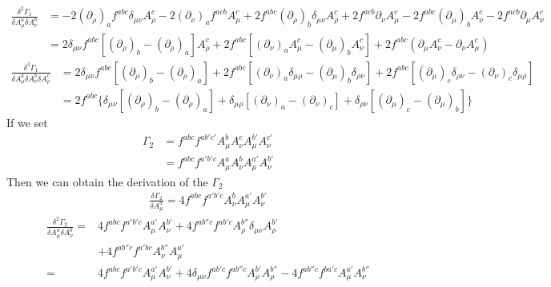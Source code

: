 \documentclass[UTF8]{article}
\begin{document}
\begin{equation}
\begin{split}
\frac{\delta^2\Gamma_1}{\delta A^{a}_{\mu}\delta A^{b}_{\nu}}&=-2(\partial_\rho)_af^{abc}\delta_{\mu\nu}A^{c}_{\rho}-2(\partial_\nu)_af^{acb}A^{c}_{\mu}
+2f^{abc}(\partial_\rho)_b\delta_{\mu\nu}A^{c}_{\rho}+2f^{acb}\partial_\nu A^{c}_{\mu}-2f^{abc}(\partial_\mu)_bA^{c}_{\nu}-2f^{acb}\partial_\mu A^{c}_{\nu}\\
&=2\delta_{\mu\nu}f^{abc}[(\partial_\rho)_b-(\partial_\rho)_a]A^{c}_{\rho}+2f^{abc}[(\partial_\nu)_aA^{c}_{\mu}-(\partial_\mu)_bA^{c}_{\nu}]+2f^{abc}
(\partial_\mu A^{c}_{\nu}-\partial_\nu A^{c}_{\mu})
\end{split}
\end{equation}
\begin{equation}
\begin{split}
\frac{\delta^3\Gamma_1}{\delta A^{a}_{\mu}\delta A^{b}_{\nu}\delta A^{c}_{\rho}}&=2\delta_{\mu\nu}f^{abc}[(\partial_\rho)_b-(\partial_\rho)_a]+2f^{abc}[(\partial_\nu)_a\delta_{\mu\rho}-(\partial_\mu)_b\delta_{\rho\nu}]+2f^{abc}[(\partial_\mu)_c\delta_{\rho\nu}-(\partial_\nu)_c\delta_{\mu\rho}]\\
&=2f^{abc} \bigg\{ \delta_{\mu\nu}[(\partial_\rho)_b-(\partial_\rho)_a]+\delta_{\mu\rho}[(\partial_\nu)_a-(\partial_\nu)_c]+\delta_{\rho\nu}[(\partial_\mu)_c-(\partial_\mu)_b] \bigg\}
\end{split}
\end{equation}
If we set
\begin{equation}
\begin{split}
\Gamma_2&=f^{abc}f^{ab'c'}A^b_\mu A^c_\nu A^{b'}_\mu A^{c'}_\nu\\
&=f^{abc}f^{a'b'c}A^a_\mu A^b_\nu A^{a'}_\mu A^{b'}_\nu
\end{split}
\end{equation}
Then we can obtain the derivation of the $\Gamma_2$
\begin{equation}
\begin{split}
\frac{\delta\Gamma_2}{\delta A^a_\mu}=4f^{abc}f^{a'b'c}A^b_\nu A^{a'}_\mu A^{b'}_\nu
\end{split}
\end{equation}
\begin{equation}
\begin{split}
\frac{\delta^2\Gamma_2}{\delta A^a_\mu\delta A^b_\nu}=&4f^{abc}f^{a'b'c}A^{a'}_\mu A^{b'}_\nu+4f^{ab''c}f^{ab'c}A^{b''}_\rho \delta_{\mu\nu} A^{b'}_\rho\\
&+4f^{ab''c}f^{a'bc}A^{b''}_\nu A^{a'}_\mu\\
=&4f^{abc}f^{a'b'c}A^{a'}_\mu A^{b'}_\nu+4\delta_{\mu\nu}f^{ab'c}f^{ab''c}A^{b'}_\rho A^{b''}_\rho-4f^{ab''c}f^{ba'c}A^{a'}_\mu A^{b''}_\nu
\end{split}
\end{equation}
\end{document}
